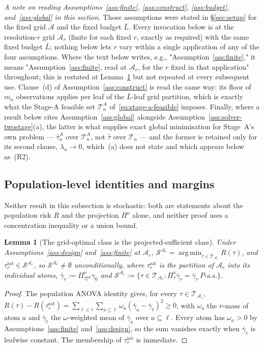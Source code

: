 \documentclass[11pt]{article}
\theoremstyle{plain}
\newtheorem{lemma}[theorem]{Lemma}
\theoremstyle{definition}
\theoremstyle{remark}
\newcommand{\cA}{\mathcal{A}}
\newcommand{\cT}{\mathcal{T}}
\newcommand{\cS}{\mathcal{S}}
\DeclareMathOperator*{\argmin}{arg\,min}
\newcommand{\gbar}{\bar\gamma}
\begin{document}
\noindent\emph{A note on reading Assumptions~\ref{ass:finite},
\ref{ass:construct}, \ref{ass:budget},
and~\ref{ass:global} in this section.} Those assumptions
were stated in \S\ref{sec:setup} for the fixed grid $\cA$ and the fixed
budget $\bar L$. Every invocation below is at the resolution-$r$ grid
$\cA_r$ (finite for each fixed $r$, exactly as required) with the same fixed
budget $\bar L$; nothing below lets $r$ vary within a single application of
any of the four assumptions.
Where the text below writes, e.g., "Assumption~\ref{ass:finite}," it means
"Assumption~\ref{ass:finite}, read at $\cA_r$, for the $r$ fixed in that
application" throughout; this is restated at
Lemma~\ref{lem:grid-optimal} but not repeated at every subsequent use.
Clause~(d) of Assumption~\ref{ass:construct} is read the same way: its floor
of $m_n$ observations applies per leaf of the $\bar L$-leaf grid partition,
which is exactly what the Stage-A feasible set $\cT^A_n$
of~\eqref{eq:stage-a-feasible} imposes.
Finally, where a result below cites Assumption~\ref{ass:global} alongside
Assumption~\ref{ass:solver-twostage}(a), the latter is what supplies exact
global minimisation for Stage~A's own problem --- $\hat\tau^A_n$ over
$\cT^A_n$, not $\widehat\tau$ over $\cT_n$ --- and the former is retained
only for its second clause, $\lambda_n\to0$, which~(a) does not state and
which appears below as~(R2).

\subsection{Population-level identities and margins}
\label{sec:topology-population}

Neither result in this subsection is stochastic: both are statements about the
population risk $R$ and the projection $\Pi^\nu$ alone, and neither proof uses
a concentration inequality or a union bound.

\begin{lemma}[The grid-optimal class is the projected-sufficient class]
\label{lem:grid-optimal}
Under Assumptions~\ref{ass:design} and~\ref{ass:finite} at $\cA_r$,
$\cS^{\cA_r}=\argmin_{\tau\in\cT_{\cA_r}}R(\tau)$, and
$\tau^{\mathrm{sat}}_r\in\cS^{\cA_r}$, so $\cS^{\cA_r}\ne\emptyset$
unconditionally, where $\tau^{\mathrm{sat}}_r$ is the partition of $\cA_r$
into its individual atoms,
$\gbar_r:=\Pi^\nu_{\tau^{\mathrm{sat}}_r}\gamma_0$
and
$\cS^{\cA_r}:=\bigl\{\tau\in\cT_{\cA_r}:\Pi^\nu_\tau\gbar_r=\gbar_r\
P\text{-a.s.}\bigr\}$.
\end{lemma}
\begin{proof}
The population ANOVA identity gives, for every $\tau\in\cT_{\cA_r}$,
$R(\tau)-R(\tau^{\mathrm{sat}}_r)
 =\sum_{\ell\in\tau}\sum_{a\subseteq\ell}\omega_a(\gbar_a-\gbar_\ell)^2\ge0$,
with $\omega_a$ the $\nu$-mass of atom $a$ and $\gbar_\ell$ the
$\omega$-weighted mean of $\gbar_a$ over $a\subseteq\ell$. Every atom has
$\omega_a>0$ by Assumptions~\ref{ass:finite} and~\ref{ass:design}, so the sum
vanishes exactly when $\gbar_r$ is leafwise constant. The membership of
$\tau^{\mathrm{sat}}_r$ is immediate.
\end{proof}
\end{document}
